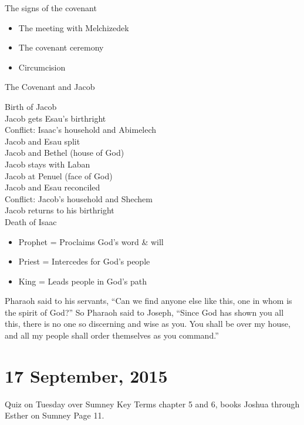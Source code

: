\documentclass{article}
\begin{document}
    The signs of the covenant

    \begin{itemize}
        \item The meeting with Melchizedek
        \item The covenant ceremony
        \item Circumcision
    \end{itemize}

    The Covenant and Jacob

    \noindent Birth of Jacob \\
    \indent Jacob gets Esau's birthright \\ 
    \indent \indent Conflict: Isaac's household and Abimelech \\
    \indent \indent \indent Jacob and Esau split \\
    \indent \indent \indent \indent Jacob and Bethel (house of God) \\
    \indent \indent \indent \indent \indent Jacob stays with Laban \\
    \indent \indent \indent \indent Jacob at Penuel (face of God) \\
    \indent \indent \indent Jacob and Esau reconciled \\
    \indent \indent Conflict: Jacob's household and Shechem \\
    \indent Jacob returns to his birthright \\
    Death of Isaac

    \begin{itemize}
        \item Prophet = Proclaims God's word \& will
        \item Priest = Intercedes for God's people
        \item King = Leads people in God's path
    \end{itemize}

    Pharaoh said to his servants, ``Can we find anyone else like this, one in whom is the spirit of God?'' So Pharaoh said to Joseph, ``Since God has shown you all this, there is no one so discerning and wise as you. You shall be over my house, and all my people shall order themselves as you command.''

\section{17 September, 2015}

    Quiz on Tuesday over Sumney Key Terms chapter 5 and 6, books Joshua through Esther on Sumney Page 11.
\end{document}
